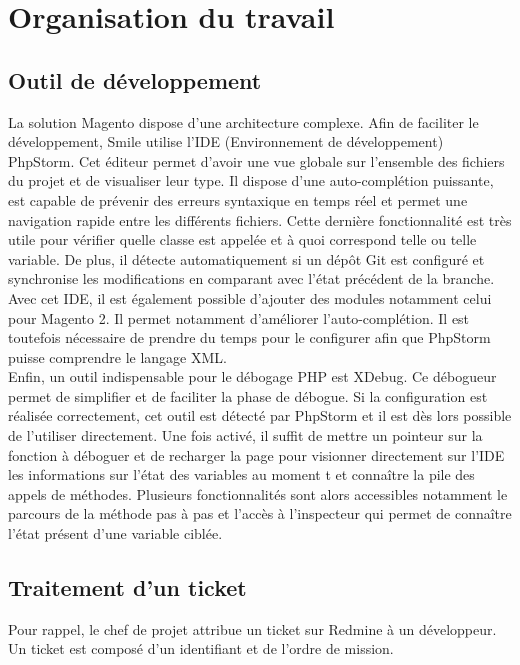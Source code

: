 \documentclass[12pt, a4paper, twoside]{report}
\begin{document}
\section{Organisation du travail}

\subsection{Outil de développement}

La solution Magento dispose d'une architecture complexe. Afin de faciliter le développement, Smile utilise l'IDE (Environnement de développement) PhpStorm. Cet éditeur permet d'avoir une vue globale sur l'ensemble des fichiers du projet et de visualiser leur type. Il dispose d'une auto-complétion puissante, est capable de prévenir des erreurs syntaxique en temps réel et permet une navigation rapide entre les différents fichiers. Cette dernière fonctionnalité est très utile pour vérifier quelle classe est appelée et à quoi correspond telle ou telle variable. De plus, il détecte automatiquement si un dépôt Git est configuré et synchronise les modifications en comparant avec l'état précédent de la branche. \\

Avec cet IDE, il est également possible d'ajouter des modules notamment celui pour Magento 2. Il permet notamment d'améliorer l'auto-complétion. Il est toutefois nécessaire de prendre du temps pour le configurer afin que PhpStorm puisse comprendre le langage XML. \\

Enfin, un outil indispensable pour le débogage PHP est XDebug. Ce débogueur permet de simplifier et de faciliter la phase de débogue. Si la configuration est réalisée correctement, cet outil est détecté par PhpStorm et il est dès lors possible de l'utiliser directement. Une fois activé, il suffit de mettre un pointeur sur la fonction à déboguer et de recharger la page pour visionner directement sur l'IDE les informations sur l'état des variables au moment t et connaître la pile des appels de méthodes. Plusieurs fonctionnalités sont alors accessibles notamment le parcours de la méthode pas à pas et l'accès à l'inspecteur qui permet de connaître l'état présent d'une variable ciblée.

\subsection{Traitement d'un ticket}

Pour rappel, le chef de projet attribue un ticket sur Redmine à un développeur. Un ticket est composé d'un identifiant et de l'ordre de mission. \\
\end{document}
